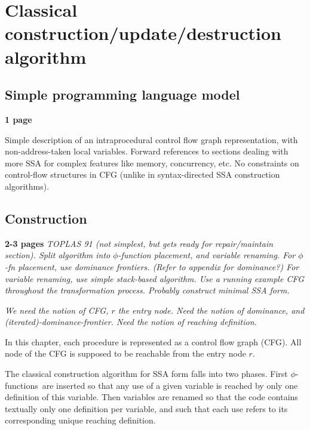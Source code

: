 \chapter{Classical construction/update/destruction algorithm }

\def\phiops{$\phi$-functions}
\def\phiop{$\phi$-function}
\section{Simple programming language model}
\textbf{1 page}

Simple description of an intraprocedural control flow graph
representation, with non-address-taken local variables.
Forward references to sections dealing with more SSA for complex
features like memory, concurrency, etc.
No constraints on control-flow structures in CFG
(unlike in syntax-directed SSA construction algorithms).


\section{Construction}
\textbf{2-3 pages}
{\em TOPLAS 91 (not simplest, but gets ready for repair/maintain section).
Split algorithm into $\phi$-function placement, and variable
renaming. For $\phi$-fn placement, use dominance frontiers.
(Refer to appendix for dominance?) 
For variable renaming, use simple stack-based algorithm.
Use a running example CFG throughout the transformation process.
Probably construct minimal SSA form.}

{\em We need the notion of CFG, $r$ the entry node. Need the notion of dominance, and (iterated)-dominance-frontier. Need the notion of reaching definition.}

In this chapter, each procedure is represented as a control flow graph (CFG). All node of the CFG is supposed to be reachable from the entry node $r$.

The classical construction algorithm for SSA form falls into two phases. 
First \phiops\ are inserted so that any use of a given variable is reached by only one definition of this variable. 
Then variables are renamed so that the code contains textually only one definition per variable, and such that each use refers to its corresponding unique reaching definition.

